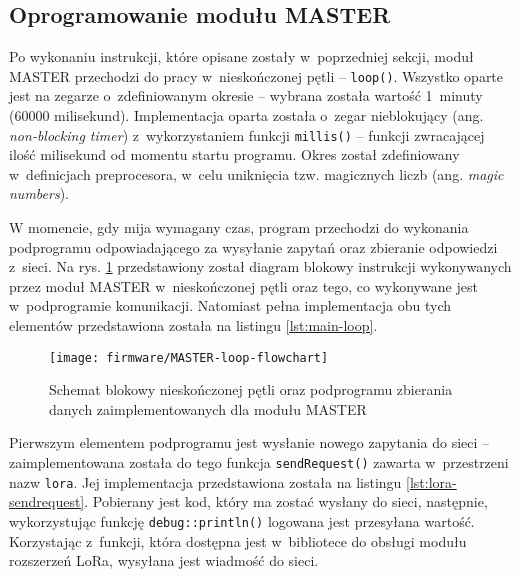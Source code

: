 



\FloatBarrier \subsection{Oprogramowanie modułu MASTER\label{sect:firmware-master}} Po wykonaniu instrukcji, które
opisane zostały w~poprzedniej sekcji, moduł MASTER przechodzi do pracy w~nieskończonej pętli -- \texttt{loop()}.
Wszystko oparte jest na zegarze o~zdefiniowanym okresie -- wybrana została wartość 1~minuty (60000 milisekund).
Implementacja oparta została o~zegar nieblokujący (ang. \textsl{non-blocking timer}) z~wykorzystaniem funkcji
\texttt{millis()} -- funkcji zwracającej ilość milisekund od momentu startu programu. Okres został zdefiniowany
w~definicjach preprocesora, w~celu uniknięcia tzw. magicznych liczb (ang. \textsl{magic numbers}).

W momencie, gdy mija wymagany czas, program przechodzi do wykonania podprogramu odpowiadającego za wysyłanie zapytań
oraz zbieranie odpowiedzi z~sieci. Na rys. \ref{img:master-flowchart} przedstawiony został diagram blokowy instrukcji
wykonywanych przez moduł MASTER w~nieskończonej pętli oraz tego, co wykonywane jest w~podprogramie komunikacji.
Natomiast pełna implementacja obu tych elementów przedstawiona została na listingu \ref{lst:main-loop}.

\begin{figure}[!htbp]
    \centering
    \texttt{[image: firmware/MASTER-loop-flowchart]}
    \caption{\label{img:master-flowchart}Schemat blokowy nieskończonej pętli oraz podprogramu zbierania danych
        zaimplementowanych dla modułu MASTER}
\end{figure}



Pierwszym elementem podprogramu jest wysłanie nowego zapytania do sieci -- zaimplementowana została do tego funkcja
\texttt{sendRequest()} zawarta w~przestrzeni nazw \texttt{lora}. Jej implementacja przedstawiona została na listingu
\ref{lst:lora-sendrequest}. Pobierany jest kod, który ma zostać wysłany do sieci, następnie, wykorzystując funkcję
\texttt{debug::println()} logowana jest przesyłana wartość. Korzystając z~funkcji, która dostępna jest w~bibliotece do
obsługi modułu rozszerzeń LoRa, wysyłana jest wiadmość do sieci.

